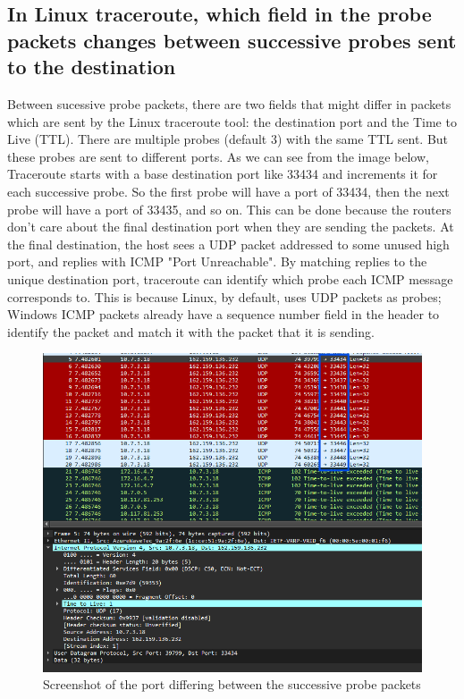 \documentclass{article}
\begin{document}
\subsection{In Linux traceroute, which field in the probe packets changes between successive probes sent to the destination}

Between sucessive probe packets, there are two fields that might differ in packets which are sent by the Linux traceroute tool: the destination port and the Time to Live (TTL). There are multiple probes (default 3) with the same TTL sent. But these probes are sent to different ports. As we can see from the image below, Traceroute starts with a base destination port like 33434 and increments it for each successive probe. So the first probe will have a port of 33434, then the next probe will have a port of 33435, and so on. This can be done because the routers don't care about the final destination port when they are sending the packets. At the final destination, the host sees a UDP packet addressed to some unused high port, and replies with ICMP "Port Unreachable". By matching replies to the unique destination port, traceroute can identify which probe each ICMP message corresponds to. This is because Linux, by default, uses UDP packets as probes; Windows ICMP packets already have a sequence number field in the header to identify the packet and match it with the packet that it is sending.





\begin{figure}[H]
    \centering
    \includegraphics[width=1\linewidth]{udp traceroute port diff.png}
    \caption{Screenshot of the port differing between the successive probe packets}
    \label{fig:placeholder}
\end{figure}
\end{document}
